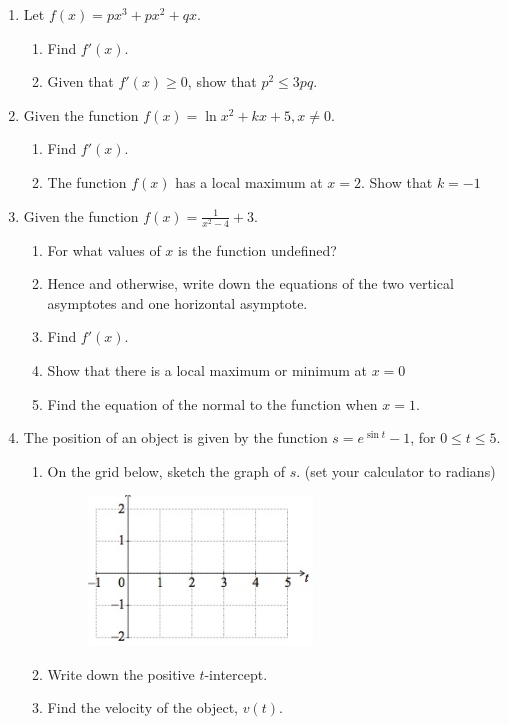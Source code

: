 \documentclass{article}
\begin{document}
\begin{enumerate}
\newpage
\item Let $f(x)=px^3+px^2+qx$.
\begin{enumerate}
    \item Find $f'(x)$.
	\item Given that $f'(x) \geq 0$, show that $p^2 \leq 3pq$.
\end{enumerate}

\item	Given the function $f(x) = \ln{x^2}+kx+5, x \neq 0$.
\begin{enumerate}
    \item Find $f'(x)$.
	\item The function $f(x)$ has a local maximum at $x=2$. Show that $k=-1$
\end{enumerate}
	 
\item Given the function $\displaystyle f(x) = \frac{1}{x^2-4} +3$.
\begin{enumerate}
    \item For what values of $x$ is the function undefined?
    \item Hence and otherwise, write down the equations of the two vertical asymptotes and one horizontal asymptote.
    \item Find $f'(x)$.
    \item Show that there is a local maximum or minimum at $x=0$
    \item Find the equation of the normal to the function when $x = 1$.
    
\end{enumerate}

\item The position of an object is given by the function $s=e^{\sin t}-1$, for $0 \leq t \leq 5$.
\begin{enumerate}
    \item On the grid below, sketch the graph of $s$. (set your calculator to radians)
    \begin{figure}[!ht]
        \centering
        \includegraphics[width=0.6\textwidth]{sine-graph.jpeg}
    \end{figure}
    \item Write down the positive $t$-intercept.
    \item Find the velocity of the object, $v(t)$.
\end{enumerate}


\end{enumerate}
\end{document}
